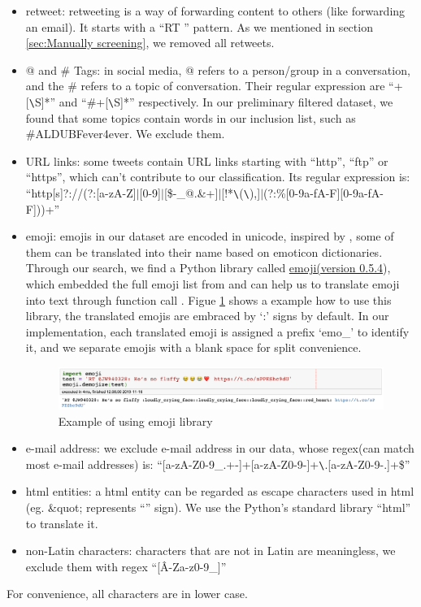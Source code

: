     \begin{itemize}
        \item retweet: retweeting is a way of forwarding content to others (like forwarding an email). It starts with a ``RT \@'' pattern. As we mentioned in section \ref{sec:Manually screening}, we removed all retweets.
        \item @ and \# Tags: in social media, @ refers to a person/group in a conversation, and the \# refers to a topic of conversation. Their regular expression are ``\@+[\verb|\|S]*'' and ``\#+[\verb|\|S]*'' respectively. In our preliminary filtered dataset, we found that some topics contain words in our inclusion list, such as \#ALDUBFever4ever. We exclude them. 
        \item URL links: some tweets contain URL links starting with ``http'', ``ftp'' or ``https'', which can't contribute to our classification. Its regular expression is:\\``http[s]?://(?:[a-zA-Z]$|$[0-9]$|$[\$-\_@.\&+]$|$[!*\verb|\|(\verb|\|),]$|$(?:\%[0-9a-fA-F][0-9a-fA-F]))+''
        \item emoji: emojis in our dataset are encoded in unicode, inspired by \cite{serban2019real}, some of them can be translated into their name based on emoticon dictionaries. Through our search, we find a Python library called \href{https://pypi.org/project/emoji/} {emoji(version 0.5.4}), which embedded the full emoji list from \cite{emo_list} and can help us to translate emoji into text through function call \cite{pytho_emo}. Figue \ref{fig:emo_lib} shows a example how to use this library, the translated emojis are embraced by `:' signs by default. In our implementation, each translated emoji is assigned a prefix `emo\_' to identify it, and we separate emojis with a blank space for split convenience.
        \begin{figure}[!htbp]
            \centering
            \includegraphics[width=5in]{images/emoji_lib.png}
            \caption{Example of using emoji library}
            \label{fig:emo_lib}
        \end{figure}
        \item e-mail address: we exclude e-mail address in our data, whose regex(can match most e-mail addresses) is:
        ``[a-zA-Z0-9\_.+-]+\@[a-zA-Z0-9-]+\verb|\|.[a-zA-Z0-9-.]+\$''
        \item html entities: a html entity can be regarded as escape characters used in html (eg. \&quot; represents ``'' sign). We use the Python's standard library ``html'' to translate it.
        \item non-Latin characters: characters that are not in Latin are meaningless, we exclude them with regex ``[\^A-Za-z0-9\_]'' 
    \end{itemize}
For convenience, all characters are in lower case. 

